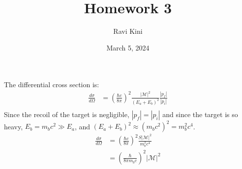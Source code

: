 \documentclass{article}
\title{Homework 3}
\author{Ravi Kini}
\date{March 5, 2024}
\begin{document}
\maketitle

The differential cross section is:
\begin{equation}
    \begin{split}
        \frac{d\sigma}{d\Omega} & = \left(\frac{\hbar c}{8\pi}\right)^2\frac{\left|\mathcal{M}\right|^2}{\left(E_a + E_b\right)^2}\frac{\left|p_f\right|}{\left|p_i\right|} \\
    \end{split}
\end{equation}
Since the recoil of the target is negligible, $\left|p_f\right| = \left|p_i\right|$ and since the target is so heavy, $E_b = m_bc^2 \gg E_a$, and $\left(E_a + E_b\right)^2 \approx \left(m_bc^2\right)^2 = m_b^2c^4$.
\begin{equation}
    \begin{split}
        \frac{d\sigma}{d\Omega} & = \left(\frac{\hbar c}{8\pi}\right)^2\frac{S\left|\mathcal{M}\right|^2}{m_b^2c^4} \\
        & = \left(\frac{\hbar}{8\pi m_bc}\right)^2\left|\mathcal{M}\right|^2 \\
    \end{split}
\end{equation}

\clearpage
\end{document}

